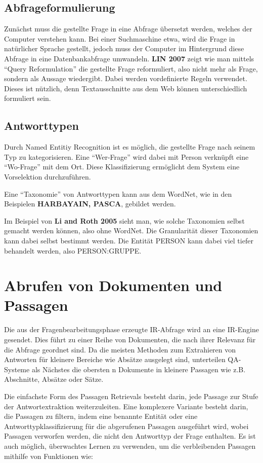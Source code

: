 \subsection{Abfrageformulierung}
Zunächst muss die gestellte Frage in eine Abfrage übersetzt werden, welches der Computer verstehen kann. Bei einer Suchmaschine etwa, wird die Frage in natürlicher Sprache gestellt, jedoch muss der Computer im Hintergrund diese Abfrage in eine Datenbankabfrage umwandeln. 
\textbf{LIN 2007} zeigt wie man mittels  \enquote{Query Reformulation} die gestellte Frage reformuliert, also nicht mehr als Frage, sondern als Aussage wiedergibt. Dabei werden vordefinierte Regeln verwendet. Dieses ist nützlich, denn Textausschnitte aus dem Web können unterschiedlich formuliert sein.

\subsection{Antworttypen}

Durch Named Entitiy Recognition ist es möglich, die gestellte Frage nach seinem Typ zu kategorisieren. Eine \enquote{Wer-Frage} wird dabei mit Person verknüpft eine \enquote{Wo-Frage} mit dem Ort. Diese Klassifizierung ermöglicht dem System eine Vorselektion durchzuführen. 

Eine \enquote{Taxonomie} von Antworttypen kann aus dem WordNet, wie in den Beispielen \textbf{HARBAYAIN, PASCA}, gebildet werden.

Im Beispiel von \textbf{Li and Roth 2005} sieht man, wie solche Taxonomien selbst gemacht werden können, also ohne WordNet. Die Granularität dieser Taxonomien kann dabei selbst bestimmt werden. Die Entität PERSON kann dabei viel tiefer behandelt werden, also PERSON:GRUPPE. 


\section{Abrufen von Dokumenten und Passagen}
Die aus der Fragenbearbeitungsphase erzeugte IR-Abfrage wird an eine IR-Engine gesendet.
Dies führt zu einer Reihe von Dokumenten, die nach ihrer Relevanz für die Abfrage geordnet sind. Da die meisten Methoden zum Extrahieren von Antworten für kleinere Bereiche wie Absätze ausgelegt sind, unterteilen QA-Systeme als Nächstes die obersten n Dokumente in kleinere Passagen wie z.B. Abschnitte, Absätze oder Sätze. 


Die einfachste Form des Passagen Retrievals besteht darin, jede Passage zur Stufe der Antwortextraktion weiterzuleiten. Eine komplexere Variante besteht darin, die Passagen zu filtern, indem eine benannte Entität oder eine Antworttypklassifizierung für die abgerufenen Passagen ausgeführt wird, wobei Passagen verworfen werden, die nicht den Antworttyp der Frage enthalten. Es ist auch möglich, überwachtes Lernen zu verwenden, um die verbleibenden Passagen mithilfe von Funktionen wie:

